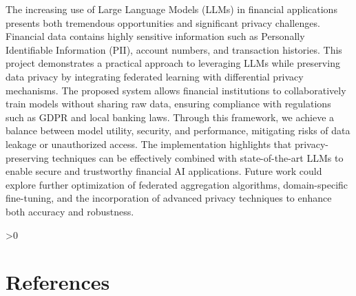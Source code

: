 \documentclass[12pt,a4paper]{report}
\let\oldchapter\chapter
\renewcommand{\chapter}{\ifnum\value{chapter}>0 \clearpage\pagestyle{fancy}\fi\oldchapter}
\begin{document}
\begin{itemize}
The increasing use of Large Language Models (LLMs) in financial applications presents both tremendous opportunities and significant privacy challenges. Financial data contains highly sensitive information such as Personally Identifiable Information (PII), account numbers, and transaction histories. This project demonstrates a practical approach to leveraging LLMs while preserving data privacy by integrating federated learning with differential privacy mechanisms. The proposed system allows financial institutions to collaboratively train models without sharing raw data, ensuring compliance with regulations such as GDPR and local banking laws. Through this framework, we achieve a balance between model utility, security, and performance, mitigating risks of data leakage or unauthorized access. The implementation highlights that privacy-preserving techniques can be effectively combined with state-of-the-art LLMs to enable secure and trustworthy financial AI applications. Future work could explore further optimization of federated aggregation algorithms, domain-specific fine-tuning, and the incorporation of advanced privacy techniques to enhance both accuracy and robustness.

\end{itemize}



    

\chapter{References}
\thispagestyle{plain}


\vspace{0.5cm}
\end{document}

